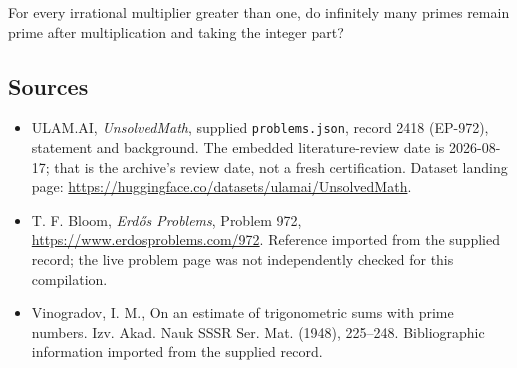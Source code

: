 \documentclass[11pt,a4paper]{article}
\begin{document}
For every irrational multiplier greater than one, do infinitely many primes remain prime after multiplication and taking the integer part?

\subsection{Sources}

{\small

\begin{itemize}

\item[\hypertarget{source:2418:1}{S1}] ULAM.AI, \emph{UnsolvedMath}, supplied \texttt{problems.json}, record 2418 (EP-972), statement and background. The embedded literature-review date is 2026-08-17; that is the archive’s review date, not a fresh certification. Dataset landing page: \url{https://huggingface.co/datasets/ulamai/UnsolvedMath}.

\item[\hypertarget{source:2418:2}{S2}] T. F. Bloom, \emph{Erdős Problems}, Problem 972, \url{https://www.erdosproblems.com/972}. Reference imported from the supplied record; the live problem page was not independently checked for this compilation.

\item[\hypertarget{source:2418:3}{S3}] Vinogradov, I. M., On an estimate of trigonometric sums with prime numbers. Izv. Akad. Nauk SSSR Ser. Mat. (1948), 225--248. Bibliographic information imported from the supplied record.

\end{itemize}

}

\label{end:2418}
\end{document}
